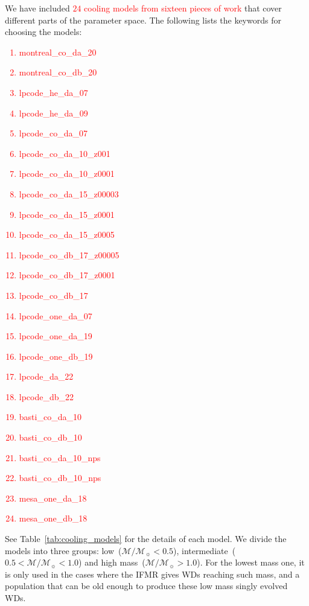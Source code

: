 \documentclass[fleqn,usenatbib]{rasti}
\newcommand{\msun}{\mathcal{M}_{\sun}}
\begin{document}
We have included \textcolor{red}{$24$ cooling models from sixteen pieces of work}
that cover different parts of the parameter space. The following lists the
keywords for choosing the models:
\textcolor{red}{
\begin{enumerate}
    \item montreal\_co\_da\_20~\citep{2020ApJ...901...93B}
    \item montreal\_co\_db\_20~\citep{2020ApJ...901...93B}
    \item lpcode\_he\_da\_07~\citep{2007MNRAS.382..779P}
    \item lpcode\_he\_da\_09~\citep{2009ApJ...704.1605A}
    \item lpcode\_co\_da\_07~\citep{2007MNRAS.382..779P}
    \item lpcode\_co\_da\_10\_z001~\citep{2010ApJ...717..183R}
    \item lpcode\_co\_da\_10\_z0001~\citep{2010ApJ...717..183R}
    \item lpcode\_co\_da\_15\_z00003~\citep{2015A&A...576A...9A}
    \item lpcode\_co\_da\_15\_z0001~\citep[]{2015A&A...576A...9A}
    \item lpcode\_co\_da\_15\_z0005~\citep[]{2015A&A...576A...9A}
    \item lpcode\_co\_db\_17\_z00005~\citep[]{2017A&A...597A..67A}
    \item lpcode\_co\_db\_17\_z0001~\citep[]{2017A&A...597A..67A}
    \item lpcode\_co\_db\_17~\citep{2017ApJ...839...11C}
    \item lpcode\_one\_da\_07~\citep{2007A&A...465..249A}
    \item lpcode\_one\_da\_19~\citep{2019A&A...625A..87C}
    \item lpcode\_one\_db\_19~\citep{2019A&A...625A..87C}
    \item lpcode\_da\_22~\citep{2013A&A...557A..19A, 2016ApJ...823..158C, 2019A&A...625A..87C}
    \item lpcode\_db\_22~\citep{2017ApJ...839...11C, 2019A&A...625A..87C}
    \item basti\_co\_da\_10~\citep{2010ApJ...716.1241S}
    \item basti\_co\_db\_10~\citep{2010ApJ...716.1241S}
    \item basti\_co\_da\_10\_nps~\citep{2010ApJ...716.1241S}
    \item basti\_co\_db\_10\_nps~\citep{2010ApJ...716.1241S}
    \item mesa\_one\_da\_18~\citep{2018MNRAS.480.1547L}
    \item mesa\_one\_db\_18~\citep{2018MNRAS.480.1547L}
\end{enumerate}
}
See Table~\ref{tab:cooling_models} for the details of each model. We divide
the models into three groups:
low~($\mathcal{M}/\msun < 0.5$),
intermediate~($0.5 < \mathcal{M}/\msun < 1.0$) and
high mass~($\mathcal{M}/\msun > 1.0$). For the lowest mass one, it is only
used in the cases where the IFMR gives WDs reaching such mass, and a
population that can be old enough to produce these low mass singly evolved
WDs.
\end{document}
